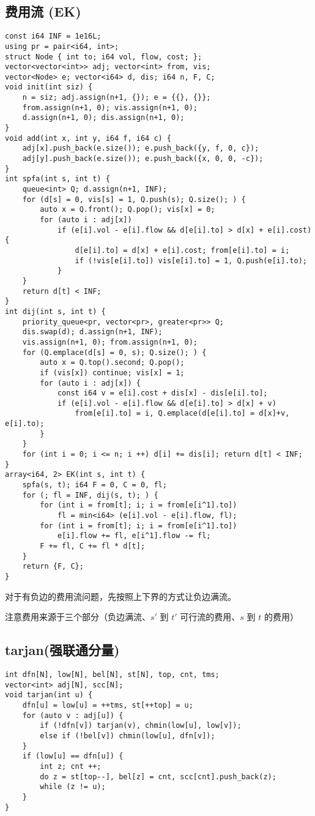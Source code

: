 \documentclass[a4paper,landscape,twocolumn]{ctexart}
\begin{document}
\subsection{费用流 (EK)}

\begin{lstlisting}
const i64 INF = 1e16L;
using pr = pair<i64, int>;
struct Node { int to; i64 vol, flow, cost; };
vector<vector<int>> adj; vector<int> from, vis;
vector<Node> e; vector<i64> d, dis; i64 n, F, C;
void init(int siz) {
	n = siz; adj.assign(n+1, {}); e = {{}, {}};
	from.assign(n+1, 0); vis.assign(n+1, 0);
	d.assign(n+1, 0); dis.assign(n+1, 0);
}
void add(int x, int y, i64 f, i64 c) {
	adj[x].push_back(e.size()); e.push_back({y, f, 0, c});
	adj[y].push_back(e.size()); e.push_back({x, 0, 0, -c});
}
int spfa(int s, int t) {
	queue<int> Q; d.assign(n+1, INF);
	for (d[s] = 0, vis[s] = 1, Q.push(s); Q.size(); ) {
		auto x = Q.front(); Q.pop(); vis[x] = 0;
		for (auto i : adj[x])
			if (e[i].vol - e[i].flow && d[e[i].to] > d[x] + e[i].cost) {
				d[e[i].to] = d[x] + e[i].cost; from[e[i].to] = i;
				if (!vis[e[i].to]) vis[e[i].to] = 1, Q.push(e[i].to);
			}
	}
	return d[t] < INF;
} 
int dij(int s, int t) {
	priority_queue<pr, vector<pr>, greater<pr>> Q;
	dis.swap(d); d.assign(n+1, INF);
	vis.assign(n+1, 0); from.assign(n+1, 0);
	for (Q.emplace(d[s] = 0, s); Q.size(); ) {
		auto x = Q.top().second; Q.pop();
		if (vis[x]) continue; vis[x] = 1;
		for (auto i : adj[x]) {
			const i64 v = e[i].cost + dis[x] - dis[e[i].to];
			if (e[i].vol - e[i].flow && d[e[i].to] > d[x] + v)
				from[e[i].to] = i, Q.emplace(d[e[i].to] = d[x]+v, e[i].to);
		}
	}
	for (int i = 0; i <= n; i ++) d[i] += dis[i]; return d[t] < INF;
}
array<i64, 2> EK(int s, int t) {
	spfa(s, t); i64 F = 0, C = 0, fl;
	for (; fl = INF, dij(s, t); ) {
		for (int i = from[t]; i; i = from[e[i^1].to])
			fl = min<i64> (e[i].vol - e[i].flow, fl);
		for (int i = from[t]; i; i = from[e[i^1].to])
			e[i].flow += fl, e[i^1].flow -= fl;
		F += fl, C += fl * d[t];
	}
	return {F, C};
}
\end{lstlisting}

对于有负边的费用流问题，先按照上下界的方式让负边满流。

注意费用来源于三个部分（负边满流、$s'$ 到 $t'$ 可行流的费用、$s$ 到 $t$ 的费用）

\subsection{tarjan(强联通分量)}

\begin{lstlisting}
int dfn[N], low[N], bel[N], st[N], top, cnt, tms;
vector<int> adj[N], scc[N];
void tarjan(int u) {
	dfn[u] = low[u] = ++tms, st[++top] = u;
	for (auto v : adj[u]) {
		if (!dfn[v]) tarjan(v), chmin(low[u], low[v]);
		else if (!bel[v]) chmin(low[u], dfn[v]);
	}
	if (low[u] == dfn[u]) {
		int z; cnt ++;
		do z = st[top--], bel[z] = cnt, scc[cnt].push_back(z);
		while (z != u);
	}
}
\end{lstlisting}
\end{document}

